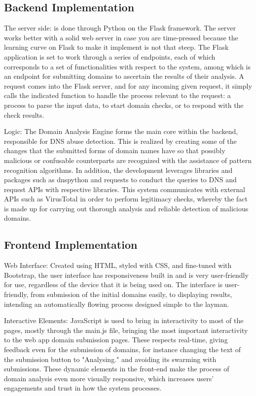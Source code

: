 \subsection{Backend Implementation}

The server side: is done through Python on the Flask framework. The server works better with a solid web server in case you are time-pressed because the learning curve on Flask to make it implement is not that steep. The Flask application is set to work through a series of endpoints, each of which corresponds to a set of functionalities with respect to the system, among which is an endpoint for submitting domains to ascertain the results of their analysis. A request comes into the Flask server, and for any incoming given request, it simply calls the indicated function to handle the process relevant to the request: a process to parse the input data, to start domain checks, or to respond with the check results.

Logic: The Domain Analysis Engine forms the main core within the backend, responsible for DNS abuse detection. This is realized by creating some of the changes that the submitted forms of domain names have so that possibly malicious or confusable counterparts are recognized with the assistance of pattern recognition algorithms. In addition, the development leverages libraries and packages such as dnspython and requests to conduct the queries to DNS and request APIs with respective libraries. This system communicates with external APIs such as VirusTotal in order to perform legitimacy checks, whereby the fact is made up for carrying out thorough analysis and reliable detection of malicious domains.

\subsection{Frontend Implementation}

Web Interface: Created using HTML, styled with CSS, and fine-tuned with Bootstrap, the user interface has responsiveness built in and is very user-friendly for use, regardless of the device that it is being used on. The interface is user-friendly, from submission of the initial domains easily, to displaying results, intending an automatically flowing process designed simple to the layman.


Interactive Elements: JavaScript is used to bring in interactivity to most of the pages, mostly through the main.js file, bringing the most important interactivity to the web app domain submission pages. These respects real-time, giving feedback even for the submission of domains, for instance changing the text of the submission button to "Analysing." and avoiding its swarming with submissions. These dynamic elements in the front-end make the process of domain analysis even more visually responsive, which increases users' engagements and trust in how the system processes.

